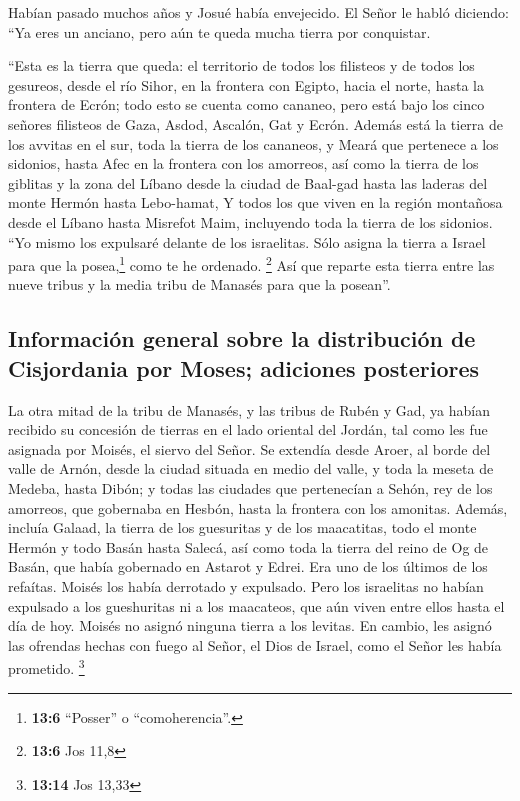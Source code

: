  Habían pasado muchos años y Josué había envejecido. El
Señor le habló diciendo: ``Ya eres un anciano, pero aún te queda mucha
tierra por conquistar.

 ``Esta es la tierra que queda: el territorio de todos los
filisteos y de todos los gesureos,  desde el río Sihor, en
la frontera con Egipto, hacia el norte, hasta la frontera de Ecrón; todo
esto se cuenta como cananeo, pero está bajo los cinco señores filisteos
de Gaza, Asdod, Ascalón, Gat y Ecrón. Además está la tierra de los
avvitas  en el sur, toda la tierra de los cananeos, y
Meará que pertenece a los sidonios, hasta Afec en la frontera con los
amorreos,  así como la tierra de los giblitas y la zona
del Líbano desde la ciudad de Baal-gad hasta las laderas del monte
Hermón hasta Lebo-hamat,  Y todos los que viven en la
región montañosa desde el Líbano hasta Misrefot Maim, incluyendo toda la
tierra de los sidonios. ``Yo mismo los expulsaré delante de los
israelitas. Sólo asigna la tierra a Israel para que la posea,\footnote{\textbf{13:6}
  ``Posser'' o ``comoherencia''.} como te he ordenado. \footnote{\textbf{13:6}
  Jos 11,8}  Así que reparte esta tierra entre las nueve
tribus y la media tribu de Manasés para que la posean''.

\hypertarget{informaciuxf3n-general-sobre-la-distribuciuxf3n-de-cisjordania-por-moses-adiciones-posteriores}{%
\subsection{Información general sobre la distribución de Cisjordania por
Moses; adiciones
posteriores}\label{informaciuxf3n-general-sobre-la-distribuciuxf3n-de-cisjordania-por-moses-adiciones-posteriores}}

 La otra mitad de la tribu de Manasés, y las tribus de
Rubén y Gad, ya habían recibido su concesión de tierras en el lado
oriental del Jordán, tal como les fue asignada por Moisés, el siervo del
Señor.  Se extendía desde Aroer, al borde del valle de
Arnón, desde la ciudad situada en medio del valle, y toda la meseta de
Medeba, hasta Dibón;  y todas las ciudades que
pertenecían a Sehón, rey de los amorreos, que gobernaba en Hesbón, hasta
la frontera con los amonitas.  Además, incluía Galaad, la
tierra de los guesuritas y de los maacatitas, todo el monte Hermón y
todo Basán hasta Salecá,  así como toda la tierra del
reino de Og de Basán, que había gobernado en Astarot y Edrei. Era uno de
los últimos de los refaítas. Moisés los había derrotado y expulsado.
 Pero los israelitas no habían expulsado a los
gueshuritas ni a los maacateos, que aún viven entre ellos hasta el día
de hoy.  Moisés no asignó ninguna tierra a los levitas.
En cambio, les asignó las ofrendas hechas con fuego al Señor, el Dios de
Israel, como el Señor les había prometido. \footnote{\textbf{13:14} Jos
  13,33}

